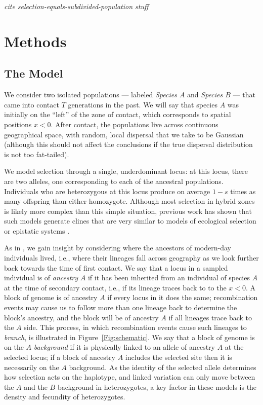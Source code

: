 \documentclass[11pt,letterpaper]{article}
\newcommand{\plr}[1]{{\em \color{blue} #1}}
\begin{document}


\plr{cite selection-equals-subdivided-population stuff}

\section*{Methods}

\subsection*{The Model}

We consider two isolated populations
--- labeled \emph{Species $A$} and \emph{Species $B$} ---  
that came into contact $T$ generations in the past.  
We will say that species $A$ was initially on the ``left'' of the zone of contact, which corresponds to spatial positions $x<0$.  
After contact, the populations live across continuous geographical space,
with random, local dispersal that we take to be Gaussian
(although this should not affect the conclusions if the true dispersal distribution is not too fat-tailed).

We model selection through a single, underdominant locus:
at this locus, there are two alleles, one corresponding to each of the ancestral populations.
Individuals who are heterozygous at this locus produce on average $1-s$ times as many offspring than either homozygote.
Although most selection in hybrid zones is likely more complex than this simple situation, 
previous work has shown that such models generate clines that are very similar to models of ecological selection or epistatic systems \cite{Kruuk1999,Barton2000a}.

As in \citet{Sedghifar2015}, 
we gain insight by considering where the ancestors of modern-day individuals lived,
i.e., where their lineages fall across geography as we look further back towards the time of first contact.
We say that a locus in a sampled individual is of \emph{ancestry} $A$ if it has been inherited from an individual of species $A$ at the time of secondary contact,
i.e., if its lineage traces back to to the $x<0$.
A block of genome is of ancestry $A$ if every locus in it does the same;
recombination events may cause us to follow more than one lineage back to determine the block's ancestry,
and the block will be of ancestry $A$ if all lineages trace back to the $A$ side.
This process, in which recombination events cause such lineages to \emph{branch},
is illustrated in Figure~\ref{Fig:schematic}.
We say that a block of genome is on the $A$ \emph{background} if it is physically linked to an allele of ancestry $A$ at the selected locus;
if a block of ancestry $A$ includes the selected site then it is necessarily on the $A$ background.
As the identity of the selected allele determines how selection acts on the haplotype,
and linked variation can only move between the $A$ and the $B$ background in heterozygotes,
a key factor in these models is the density and fecundity of heterozygotes.
\end{document}
